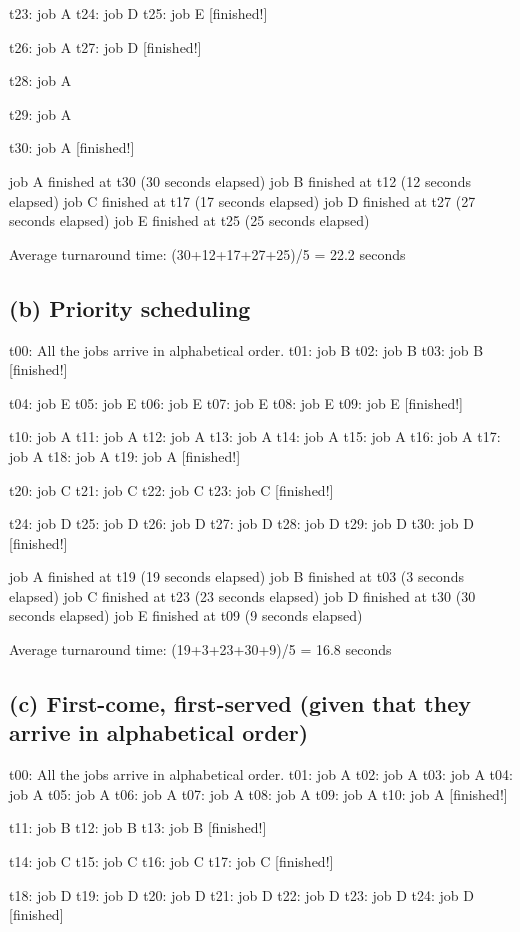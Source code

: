 \documentclass[11pt]{article}
\begin{document}
t23: job A
t24: job D
t25: job E [finished!]

t26: job A
t27: job D [finished!]

t28: job A

t29: job A

t30: job A [finished!]

job A finished at t30 (30 seconds elapsed)
job B finished at t12 (12 seconds elapsed)
job C finished at t17 (17 seconds elapsed)
job D finished at t27 (27 seconds elapsed)
job E finished at t25 (25 seconds elapsed)

Average turnaround time: (30+12+17+27+25)/5 = 22.2 seconds

\subsection*{(b) Priority scheduling}
t00: All the jobs arrive in alphabetical order. 
t01: job B
t02: job B
t03: job B [finished!]

t04: job E
t05: job E
t06: job E
t07: job E
t08: job E
t09: job E [finished!]

t10: job A
t11: job A
t12: job A 
t13: job A
t14: job A
t15: job A
t16: job A
t17: job A
t18: job A
t19: job A [finished!]

t20: job C
t21: job C
t22: job C
t23: job C [finished!]

t24: job D
t25: job D 
t26: job D
t27: job D
t28: job D
t29: job D
t30: job D [finished!]

job A finished at t19 (19 seconds elapsed)
job B finished at t03 (3 seconds elapsed)
job C finished at t23 (23 seconds elapsed)
job D finished at t30 (30 seconds elapsed)
job E finished at t09 (9 seconds elapsed)

Average turnaround time: (19+3+23+30+9)/5 = 16.8 seconds


\subsection*{(c) First-come, first-served (given that they arrive in alphabetical order)}
t00: All the jobs arrive in alphabetical order. 
t01: job A
t02: job A
t03: job A
t04: job A
t05: job A
t06: job A
t07: job A
t08: job A
t09: job A
t10: job A [finished!]

t11: job B
t12: job B 
t13: job B [finished!]

t14: job C
t15: job C
t16: job C
t17: job C [finished!]

t18: job D
t19: job D
t20: job D
t21: job D
t22: job D
t23: job D
t24: job D [finished]
\end{document}
